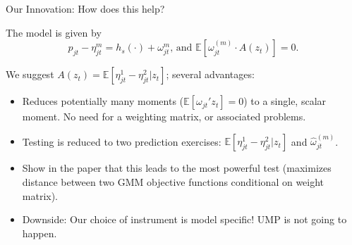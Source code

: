 \documentclass[aspectratio=169,10pt]{beamer}
\begin{document}
\begin{frame}[plain,label=innovation]{Our Innovation: How does this help?}
\begin{small}
The model is given by
$$p_{jt} - \eta^m_{jt} = h_s(\cdot) +  \omega^m_{jt} \text{,   and  } \mathbb{E}[\omega_{jt}^{(m)}\cdot A(z_t)] = 0.$$

We suggest $A(z_t) = \mathbb{E}[\eta^1_{jt}-\eta_{jt}^2|z_{t}]$; several advantages:
\pause
\begin{itemize}
\item Reduces potentially many moments ($\mathbb{E}[\omega_{jt}' z_t]=0$) to a single, scalar moment. No need for a weighting matrix, or associated problems.
\item Testing is reduced to two prediction exercises: $\mathbb{E}[\eta^1_{jt}-\eta_{jt}^2|z_{t}]$ and $\widehat \omega_{jt}^{(m)}$.
\item Show in the paper that this leads to the most powerful test (maximizes distance between two GMM objective functions conditional on weight matrix).
\item Downside: Our choice of instrument is \alert{model specific}! UMP is not going to happen.
\end{itemize}
\end{small}
\end{frame}
\end{document}

